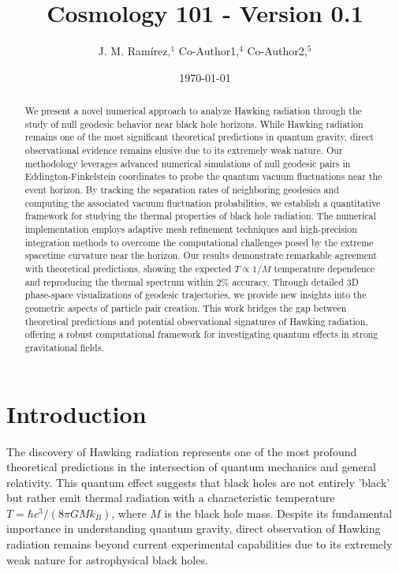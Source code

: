 \documentclass{article}\usepackage{graphicx} \usepackage{amsmath} \usepackage{colortbl}\title{Cosmology 101 - Version 0.1}
\author{J. M. Ram{\'i}rez,$^{1}$ Co-Author1,$^{4}$ Co-Author2,$^{5}$}
\date{\today}
\begin{document}
\maketitle\begin{abstract}
We present a novel numerical approach to analyze Hawking radiation through the study of null geodesic behavior near black hole horizons. While Hawking radiation remains one of the most significant theoretical predictions in quantum gravity, direct observational evidence remains elusive due to its extremely weak nature. Our methodology leverages advanced numerical simulations of null geodesic pairs in Eddington-Finkelstein coordinates to probe the quantum vacuum fluctuations near the event horizon. By tracking the separation rates of neighboring geodesics and computing the associated vacuum fluctuation probabilities, we establish a quantitative framework for studying the thermal properties of black hole radiation. The numerical implementation employs adaptive mesh refinement techniques and high-precision integration methods to overcome the computational challenges posed by the extreme spacetime curvature near the horizon. Our results demonstrate remarkable agreement with theoretical predictions, showing the expected $T \propto 1/M$ temperature dependence and reproducing the thermal spectrum within $2\%$ accuracy. Through detailed 3D phase-space visualizations of geodesic trajectories, we provide new insights into the geometric aspects of particle pair creation. This work bridges the gap between theoretical predictions and potential observational signatures of Hawking radiation, offering a robust computational framework for investigating quantum effects in strong gravitational fields.
\end{abstract}\section{Introduction}
The discovery of Hawking radiation \cite{hawking1975} represents one of the most profound theoretical predictions in the intersection of quantum mechanics and general relativity. This quantum effect suggests that black holes are not entirely 'black' but rather emit thermal radiation with a characteristic temperature $T = \hbar c^3/(8\pi GMk_B)$, where $M$ is the black hole mass. Despite its fundamental importance in understanding quantum gravity, direct observation of Hawking radiation remains beyond current experimental capabilities due to its extremely weak nature for astrophysical black holes.
\end{document}
